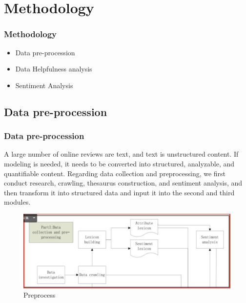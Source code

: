 \documentclass{beamer}
\begin{document}
\section{Methodology}
\begin{frame}
    \frametitle{Methodology}
    \begin{itemize}
        \item Data pre-procession
        \item Data Helpfulness analysis
        \item Sentiment Analysis
    \end{itemize}
\end{frame}

\subsection{Data pre-procession}
\begin{frame}
    \frametitle{Data pre-procession}
    A large number of online reviews are text, and text is unstructured content. If modeling is needed, it needs to be converted into structured, analyzable, and quantifiable content. Regarding data collection and preprocessing, we first conduct research, crawling, thesaurus construction, and sentiment analysis, and then transform it into structured data and input it into the second and third modules.
    \begin{figure}[]
        \centering
        \includegraphics[width=0.6\linewidth]{fig/preprocess}
        \caption{Preprocess}
    \end{figure}
\end{frame}
\end{document}
